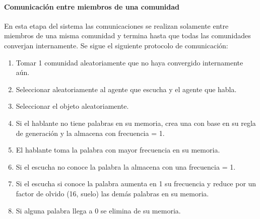 \documentclass[runningheads]{llncs}
\begin{document}
\paragraph{Comunicación entre miembros de una comunidad}
En esta etapa del sistema las comunicaciones se realizan solamente entre miembros de una misma comunidad y termina hasta que todas las comunidades converjan internamente.
Se sigue el siguiente protocolo de comunicación:
\begin{enumerate}
	\item Tomar 1 comunidad aleatoriamente que no haya convergido internamente aún.
	\item Seleccionar aleatoriamente al agente que escucha y el agente que habla.
	\item Seleccionar el objeto aleatoriamente.
	\item Si el hablante no tiene palabras en su memoria, crea una con base en su regla de generación y la almacena con frecuencia = 1.
	\item El hablante toma la palabra con mayor frecuencia en su memoria.
	\item Si el escucha no conoce la palabra la almacena con una frecuencia = 1.
	\item Si el escucha si conoce la palabra aumenta en 1 su frecuencia y reduce por un factor de olvido (16, suelo) las demás palabras en su memoria.
	\item Si alguna palabra llega a 0 se elimina de su memoria. 
\end{enumerate}
\end{document}
